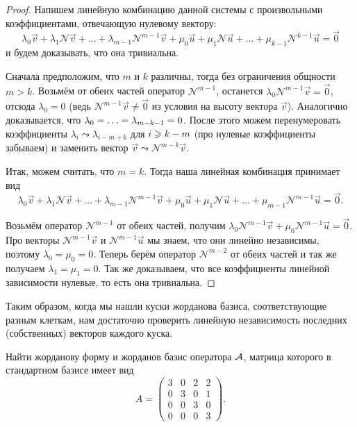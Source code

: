 \begin{proof}
	Напишем линейную комбинацию данной системы с произвольными коэффициентами, отвечающую нулевому вектору:
	\[
		\lambda_0\vec{v} + \lambda_1\mathcal{N}\vec{v} + \ldots + \lambda_{m - 1}\mathcal{N}^{m - 1}\vec{v} + \mu_0\vec{u} + \mu_1\mathcal{N}\vec{u} + \ldots + \mu_{k - 1}\mathcal{N}^{k - 1}\vec{u} = \vec{0}
	\]
	и будем доказывать, что она тривиальна.

	Сначала предположим, что $m$ и $k$ различны, тогда без ограничения общности $m > k$. Возьмём от обеих частей оператор $\mathcal{N}^{m - 1}$, останется $\lambda_0\mathcal{N}^{m - 1}\vec{v} = \vec{0}$, отсюда $\lambda_0 = 0$ (ведь $\mathcal{N}^{m - 1}\vec{v} \ne \vec{0}$ из условия на высоту вектора $\vec{v}$). Аналогично доказывается, что $\lambda_0 = \ldots \hm= \lambda_{m - k - 1} = 0$. После этого можем перенумеровать коэффициенты $\lambda_i \leadsto \lambda_{i - m + k}$ для $i \hm\geqslant k - m$ (про нулевые коэффициенты забываем) и заменить вектор $\vec{v} \leadsto \mathcal{N}^{m - k}\vec{v}$.

	Итак, можем считать, что $m = k$. Тогда наша линейная комбинация принимает вид
	\[
		\lambda_0\vec{v} + \lambda_1\mathcal{N}\vec{v} + \ldots + \lambda_{m - 1}\mathcal{N}^{m - 1}\vec{v} + \mu_0\vec{u} + \mu_1\mathcal{N}\vec{u} + \ldots + \mu_{m - 1}\mathcal{N}^{m - 1}\vec{u} = \vec{0}.
	\]

	Возьмём оператор $\mathcal{N}^{m - 1}$ от обеих частей, получим $\lambda_0\mathcal{N}^{m - 1}\vec{v} + \mu_0\mathcal{N}^{m - 1}\vec{u} = \vec{0}$. Про векторы $\mathcal{N}^{m - 1}\vec{v}$ и $\mathcal{N}^{m - 1}\vec{u}$ мы знаем, что они линейно независимы, поэтому $\lambda_0 = \mu_0 = 0$. Теперь берём оператор $\mathcal{N}^{m - 2}$ от обеих частей и так же получаем $\lambda_1 = \mu_1 = 0$. Так же доказываем, что все коэффициенты линейной зависимости нулевые, то есть она тривиальна.
\end{proof}

Таким образом, когда мы нашли куски жорданова базиса, соответствующие разным клеткам, нам достаточно проверить линейную независимость последних (собственных) векторов каждого куска.

\begin{problem}
	Найти жорданову форму и жорданов базис оператора $\mathcal{A}$, матрица которого в стандартном базисе имеет вид
	\[
		A =
		\begin{pmatrix}
			3 & 0 & 2 & 2\\
			0 & 3 & 0 & 1\\
			0 & 0 & 3 & 0\\
			0 & 0 & 0 & 3
		\end{pmatrix}.
	\]
\end{problem}

